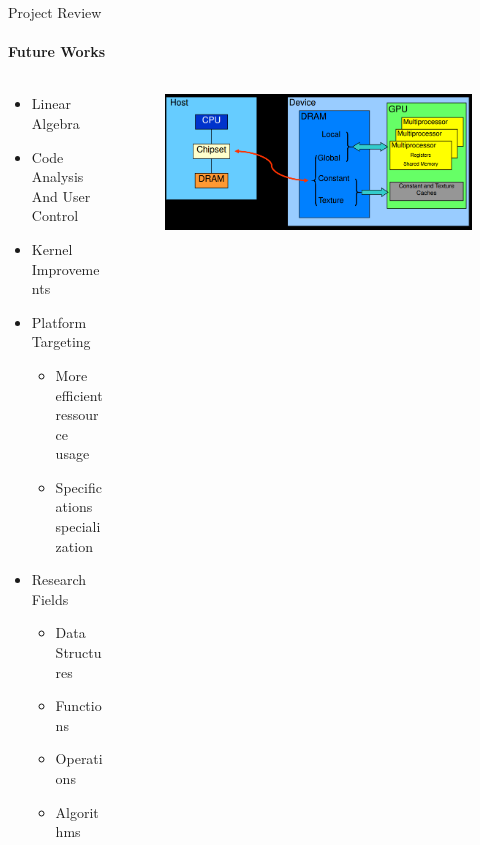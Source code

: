 	\begin{frame}[t]{Project Review}\framesubtitle{Future Works}
	\begin{columns}[T]
	\begin{column}{0.48\textwidth}
		\begin{itemize}
			\item Linear Algebra
			\item Code Analysis And User Control
			\item Kernel Improvements
			\item Platform Targeting
			\begin{itemize}
				\item More efficient ressource usage
				\item Specifications specialization
			\end{itemize}
			\item Research Fields
			\begin{itemize}
				\item Data Structures
				\item Functions
				\item Operations
				\item Algorithms
			\end{itemize}
		\end{itemize}
	\end{column}
	\begin{column}{.48\textwidth}
      \begin{figure}
         \includegraphics[width=1\textwidth]{images/GPUMemoryClear.png}
      \end{figure}
    \end{column}
    \end{columns}
	\end{frame}